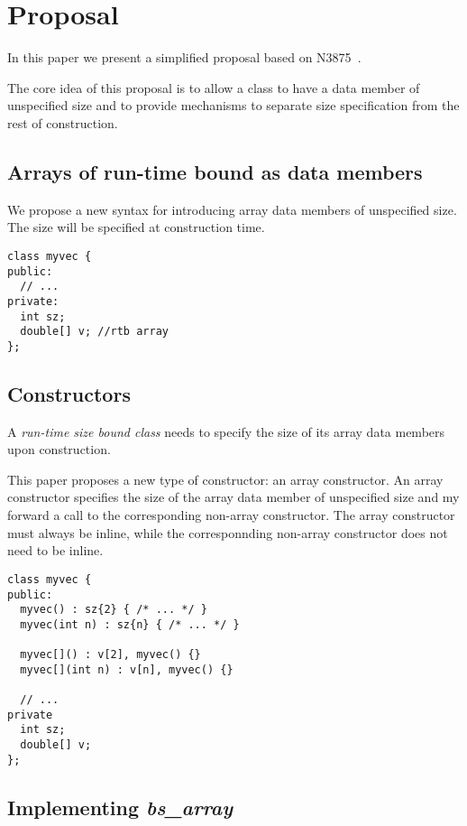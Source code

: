\section{Proposal}

In this paper we present a simplified proposal based on N3875~\cite{n3875}.

The core idea of this proposal is to allow a class to have a data member of
unspecified size and to provide mechanisms to separate size specification
from the rest of construction.

\subsection{Arrays of run-time bound as data members}

We propose a new syntax for introducing array data members of unspecified size.
The size will be specified at construction time.

\begin{lstlisting}
class myvec {
public:
  // ...
private:
  int sz;
  double[] v; //rtb array
};
\end{lstlisting}

\subsection{Constructors}

A \emph{run-time size bound class} needs to specify the size of its array data
members upon construction.

This paper proposes a new type of constructor: an array constructor. An array
constructor specifies the size of the array data member of unspecified size and
my forward a call to the corresponding non-array constructor. The array
constructor must always be inline, while the corresponnding non-array
constructor does not need to be inline.

\begin{lstlisting}
class myvec {
public:
  myvec() : sz{2} { /* ... */ }
  myvec(int n) : sz{n} { /* ... */ }

  myvec[]() : v[2], myvec() {}
  myvec[](int n) : v[n], myvec() {}

  // ...
private
  int sz;
  double[] v;
};
\end{lstlisting}

\subsection{Implementing \emph{bs\_array}}

